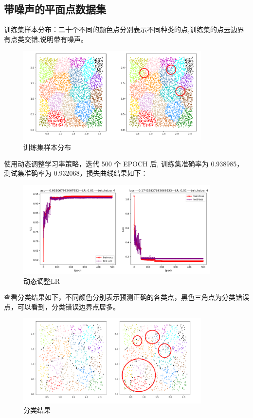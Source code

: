 \documentclass[12pt]{article}
\begin{document}
	\subsection{带噪声的平面点数据集}
	
	训练集样本分布：二十个不同的颜色点分别表示不同种类的点,训练集的点云边界有点类交错,说明带有噪声。
	
	\begin{figure}[H]
		\centering
		\includegraphics[width=3.8in]{./images/plane_noise_train_dist.png}
		\centering
		\caption{训练集样本分布}
	\end{figure}

	使用动态调整学习率策略，迭代 500 个 EPOCH 后, 训练集准确率为 0.938985，测试集准确率为 0.932068，损失曲线结果如下：
	
	\begin{figure}[H]
		\centering
		\includegraphics[width=4in]{./images/plane_noise_loss_step.png}
		\centering
		\caption{动态调整LR}
	\end{figure}

	查看分类结果如下，不同颜色分别表示预测正确的各类点，黑色三角点为分类错误点，可以看到，分类错误边界点居多。
	
	\begin{figure}[H]
		\centering
		\includegraphics[width=3.8in]{./images/plane_noise_result.png}
		\centering
		\caption{分类结果}
	\end{figure}
\end{document}
